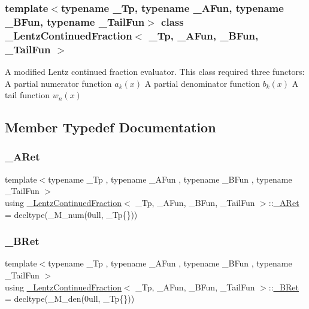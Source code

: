 \subsubsection*{template$<$typename \+\_\+\+Tp, typename \+\_\+\+A\+Fun, typename \+\_\+\+B\+Fun, typename \+\_\+\+Tail\+Fun$>$\newline
class \+\_\+\+Lentz\+Continued\+Fraction$<$ \+\_\+\+Tp, \+\_\+\+A\+Fun, \+\_\+\+B\+Fun, \+\_\+\+Tail\+Fun $>$}

A modified Lentz continued fraction evaluator. This class required three functors\+: A partial numerator function $ a_k(x) $ A partial denominator function $ b_k(x) $ A tail function $ w_n(x) $ 

\subsection{Member Typedef Documentation}
\mbox{\label{class__LentzContinuedFraction_a44dee6f8bd3dfe70d76c85b518589dec}} 
\subsubsection{\texorpdfstring{\+\_\+\+A\+Ret}{\_ARet}}
{\footnotesize\ttfamily template$<$typename \+\_\+\+Tp , typename \+\_\+\+A\+Fun , typename \+\_\+\+B\+Fun , typename \+\_\+\+Tail\+Fun $>$ \\
using \hyperlink{class__LentzContinuedFraction}{\+\_\+\+Lentz\+Continued\+Fraction}$<$ \+\_\+\+Tp, \+\_\+\+A\+Fun, \+\_\+\+B\+Fun, \+\_\+\+Tail\+Fun $>$\+::\hyperlink{class__LentzContinuedFraction_a44dee6f8bd3dfe70d76c85b518589dec}{\+\_\+\+A\+Ret} =  decltype(\+\_\+\+M\+\_\+num(0ull, \+\_\+\+Tp\{\}))}

\mbox{\label{class__LentzContinuedFraction_a97536abf4c68ac813d692d204ac47ba4}} 
\subsubsection{\texorpdfstring{\+\_\+\+B\+Ret}{\_BRet}}
{\footnotesize\ttfamily template$<$typename \+\_\+\+Tp , typename \+\_\+\+A\+Fun , typename \+\_\+\+B\+Fun , typename \+\_\+\+Tail\+Fun $>$ \\
using \hyperlink{class__LentzContinuedFraction}{\+\_\+\+Lentz\+Continued\+Fraction}$<$ \+\_\+\+Tp, \+\_\+\+A\+Fun, \+\_\+\+B\+Fun, \+\_\+\+Tail\+Fun $>$\+::\hyperlink{class__LentzContinuedFraction_a97536abf4c68ac813d692d204ac47ba4}{\+\_\+\+B\+Ret} =  decltype(\+\_\+\+M\+\_\+den(0ull, \+\_\+\+Tp\{\}))}

